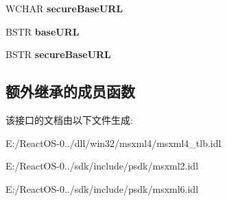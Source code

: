 \begin{DoxyCompactItemize}
W\+C\+H\+AR {\bfseries secure\+Base\+U\+RL}
\item 
\mbox{\label{interface_m_s_x_m_l2_1_1_i_v_b_s_a_x_x_m_l_reader_a34b7922d2d83b43e48e67ca90939a24e}} 
B\+S\+TR {\bfseries base\+U\+RL}
\item 
\mbox{\label{interface_m_s_x_m_l2_1_1_i_v_b_s_a_x_x_m_l_reader_aecbc78b7904fb68903f1fb78b2863725}} 
B\+S\+TR {\bfseries secure\+Base\+U\+RL}
\end{DoxyCompactItemize}
\subsection*{额外继承的成员函数}


该接口的文档由以下文件生成\+:\begin{DoxyCompactItemize}
\item 
E\+:/\+React\+O\+S-\/0../dll/win32/msxml4/msxml4\+\_\+tlb.\+idl\item 
E\+:/\+React\+O\+S-\/0../sdk/include/psdk/msxml2.\+idl\item 
E\+:/\+React\+O\+S-\/0../sdk/include/psdk/msxml6.\+idl\end{DoxyCompactItemize}
